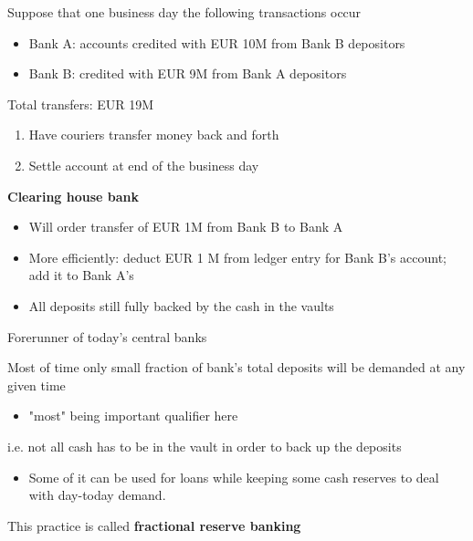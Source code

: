 \documentclass{beamer}
\begin{document}
\begin{frame}
  Suppose that one business day the following transactions occur
\begin{itemize}
  \item Bank A: accounts credited with EUR 10M from Bank B depositors
  \item Bank B: credited with EUR 9M from Bank A depositors
\end{itemize}
 \medskip
 Total transfers: EUR 19M\\
 \begin{enumerate}
   \item Have couriers transfer money back and forth
   \item Settle account at end of the business day
 \end{enumerate}
\end{frame}

\begin{frame}
  \textbf{Clearing house bank}
  \begin{itemize}
  \item Will order transfer of EUR 1M from Bank B to Bank A
  \item More efficiently: deduct EUR 1 M from ledger entry for Bank B's account; add it to Bank A's
  \item All deposits still fully backed by the cash in the vaults
\end{itemize}
\medskip
Forerunner of today's central banks
\end{frame}

\begin{frame}
 Most of time only small fraction of bank's total deposits will be demanded at any given time
 \begin{itemize}
   \item "most" being important qualifier here
 \end{itemize}
 \medskip
 i.e. not all cash has to be in the vault in order to back up the deposits
 \begin{itemize}
   \item Some of it can be used for loans while keeping some cash reserves to deal with day-today demand. 
 \end{itemize}
This practice is called \textbf{fractional reserve banking }
\end{frame}
\end{document}
